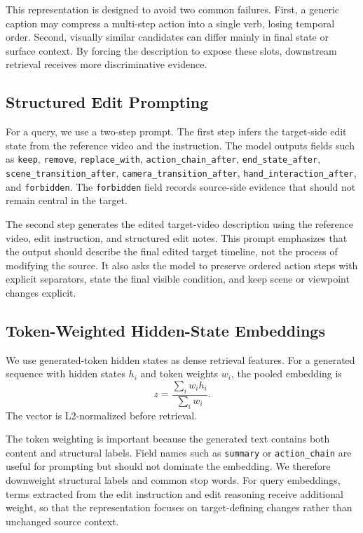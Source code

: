 \documentclass[10pt,twocolumn,letterpaper]{article}
\begin{document}
This representation is designed to avoid two common failures.
First, a generic caption may compress a multi-step action into a single verb, losing temporal order.
Second, visually similar candidates can differ mainly in final state or surface context.
By forcing the description to expose these slots, downstream retrieval receives more discriminative evidence.

\subsection{Structured Edit Prompting}

For a query, we use a two-step prompt.
The first step infers the target-side edit state from the reference video and the instruction.
The model outputs fields such as \texttt{keep}, \texttt{remove}, \texttt{replace\_with}, \texttt{action\_chain\_after}, \texttt{end\_state\_after}, \texttt{scene\_transition\_after}, \texttt{camera\_transition\_after}, \texttt{hand\_interaction\_after}, and \texttt{forbidden}.
The \texttt{forbidden} field records source-side evidence that should not remain central in the target.

The second step generates the edited target-video description using the reference video, edit instruction, and structured edit notes.
This prompt emphasizes that the output should describe the final edited target timeline, not the process of modifying the source.
It also asks the model to preserve ordered action steps with explicit separators, state the final visible condition, and keep scene or viewpoint changes explicit.

\subsection{Token-Weighted Hidden-State Embeddings}

We use generated-token hidden states as dense retrieval features.
For a generated sequence with hidden states $h_i$ and token weights $w_i$, the pooled embedding is
\begin{equation}
    z = \frac{\sum_i w_i h_i}{\sum_i w_i}.
\end{equation}
The vector is L2-normalized before retrieval.

The token weighting is important because the generated text contains both content and structural labels.
Field names such as \texttt{summary} or \texttt{action\_chain} are useful for prompting but should not dominate the embedding.
We therefore downweight structural labels and common stop words.
For query embeddings, terms extracted from the edit instruction and edit reasoning receive additional weight, so that the representation focuses on target-defining changes rather than unchanged source context.
\end{document}
